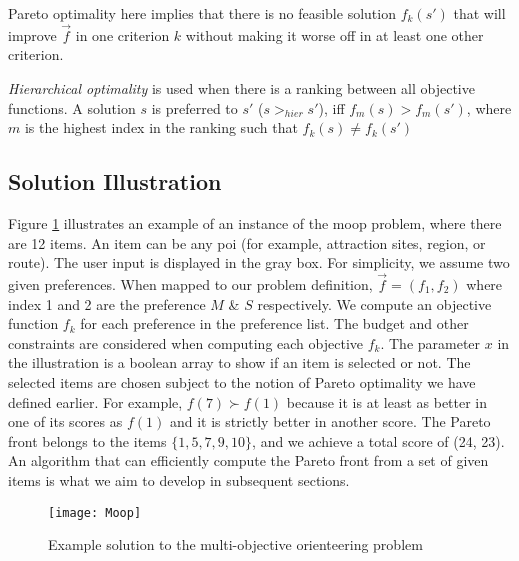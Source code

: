Pareto optimality here implies that there is no feasible solution $f_k(s')$ that will improve $\Vec{f}$ in one criterion $k$ without making it worse off in at least one other criterion.  

\textit{Hierarchical optimality} is used when there is a ranking between all objective functions. A solution $s$ is preferred to $s'$ ($s>_{hier} s'$), iff $f_m(s) > f_m(s')$, where $m$ is the highest index in the ranking such that $f_k(s) \neq f_k(s')$

\subsection{Solution Illustration}
Figure \ref{fig:moopsample} illustrates an example of an instance of the \gls{moop} problem, where there are 12 items. An item can be any \gls{poi} (for example, attraction sites, region, or route). The user input is displayed in the gray box. For simplicity, we assume two given preferences. When mapped to our problem definition, $\Vec{f} = (f_1, f_2)$ where index 1 and 2 are the preference $M$ \& $S$ respectively. We compute an objective function $f_k$ for each preference in the preference list. The budget and other constraints are considered when computing each objective $f_k$. The parameter $x$ in the illustration is a boolean array to show if an item is selected or not. The selected items are chosen subject to the notion of Pareto optimality we have defined earlier. For example, $f(7) \succ f(1)$ because it is at least as better in one of its scores as $f(1)$ and it is strictly better in another score. The Pareto front belongs to the items $\{1,5,7,9,10\}$, and we achieve a total score of (24, 23). An algorithm that can efficiently compute the Pareto front from a set of given items is what we aim to develop in subsequent sections.


\begin{figure}[ht!]
    \centering
    \texttt{[image: Moop]}
    \caption{Example solution to the multi-objective orienteering problem}
    \label{fig:moopsample}
\end{figure}

